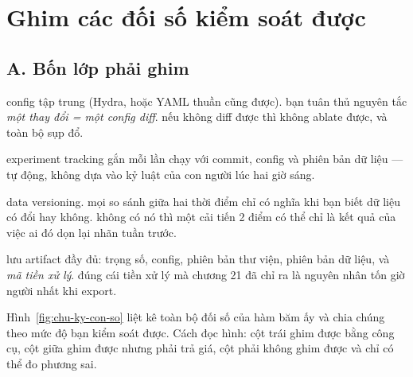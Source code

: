 \documentclass[../../deep_learning.tex]{subfiles}
\begin{document}
\section{Ghim các đối số kiểm soát được}

\subsection{A. Bốn lớp phải ghim}
\begin{mach}
\item {} \gp config tập trung (Hydra, hoặc YAML thuần cũng được). \gd bạn tuân thủ nguyên tắc \emph{một thay đổi = một config diff}. \hq nếu không diff được thì không ablate được, và toàn bộ  sụp đổ.
\item {} \gp experiment tracking gắn mỗi lần chạy với commit, config và phiên bản dữ liệu --- tự động, không dựa vào kỷ luật của con người lúc hai giờ sáng.
\item {} \gp data versioning. \gd mọi so sánh giữa hai thời điểm chỉ có nghĩa khi bạn biết dữ liệu có đổi hay không. \vdm không có nó thì một cải tiến 2 điểm có thể chỉ là kết quả của việc ai đó dọn lại nhãn tuần trước.
\item {} \gp lưu artifact đầy đủ: trọng số, config, phiên bản thư viện, phiên bản dữ liệu, và \emph{mã tiền xử lý}. \hq đúng cái tiền xử lý mà chương 21 đã chỉ ra là nguyên nhân tốn giờ người nhất khi export.
\end{mach}

Hình~\ref{fig:chu-ky-con-so} liệt kê toàn bộ đối số của hàm băm ấy và chia chúng theo mức độ bạn kiểm soát được. Cách đọc hình: cột trái ghim được bằng công cụ, cột giữa ghim được nhưng phải trả giá, cột phải không ghim được và chỉ có thể đo phương sai.
\end{document}
